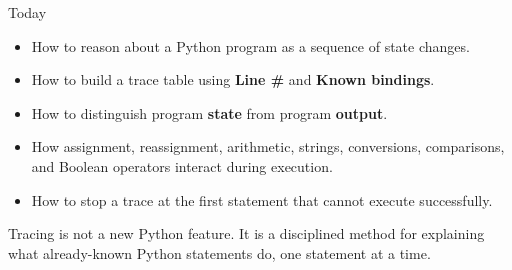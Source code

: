\documentclass[aspectratio=169,10pt]{beamer}
\begin{document}
\makedecktitle

\begin{frame}{Today}
  \begin{itemize}
    \item How to reason about a Python program as a sequence of state changes.
    \item How to build a trace table using \textbf{Line \#} and \textbf{Known bindings}.
    \item How to distinguish program \textbf{state} from program \textbf{output}.
    \item How assignment, reassignment, arithmetic, strings, conversions, comparisons, and Boolean operators interact during execution.
    \item How to stop a trace at the first statement that cannot execute successfully.
  \end{itemize}

  \begin{keyidea}
    Tracing is not a new Python feature. It is a disciplined method for explaining what already-known Python statements do, one statement at a time.
  \end{keyidea}
\end{frame}
\end{document}
